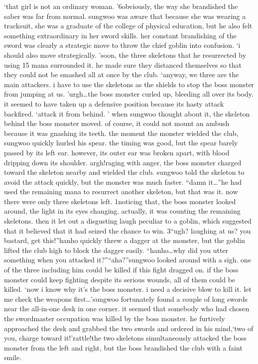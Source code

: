 ‘that girl is not an ordinary woman.
’6obviously, the way she brandished the saber was far from normal.
 sungwoo was aware that because she was wearing a tracksuit, she was a graduate of the college of physical education, but he also felt something extraordinary in her sword skills.
her constant brandishing of the sword was clearly a strategic move to throw the chief goblin into confusion.
‘i should also move strategically.
’soon, the three skeletons that he resurrected by using 15 mana surrounded it.
 he made sure they distanced themselves so that they could not be smashed all at once by the club.
‘anyway, we three are the main attackers.
 i have to use the skeletons as the shields to stop the boss monster from jumping at us.
’urgh…the boss monster curled up, bleeding all over its body.
 it seemed to have taken up a defensive position because its hasty attack backfired.
‘attack it from behind.
’
when sungwoo thought about it, the skeleton behind the boss monster moved.
 of course, it could not mount an ambush because it was gnashing its teeth.
the moment the monster wielded the club, sungwoo quickly hurled his spear.
the timing was good, but the spear barely passed by its left ear.
 however, its outer ear was broken apart, with blood dripping down its shoulder.
argh!raging with anger, the boss monster charged toward the skeleton nearby and wielded the club.
 sungwoo told the skeleton to avoid the attack quickly, but the monster was much faster.
“damn it…”he had used the remaining mana to resurrect another skeleton, but that was it.
 now there were only three skeletons left.
1noticing that, the boss monster looked around, the light in its eyes changing.
 actually, it was counting the remaining skeletons.
then it let out a disgusting laugh peculiar to a goblin, which suggested that it believed that it had seized the chance to win.
3“ugh? laughing at us? you bastard, get this!”hanho quickly threw a dagger at the monster, but the goblin lifted the club high to block the dagger easily.
“hanho…why did you utter something when you attacked it?”“aha?”sungwoo looked around with a sigh.
 one of the three including him could be killed if this fight dragged on.
 if the boss monster could keep fighting despite its serious wounds, all of them could be killed.
‘now i know why it’s the boss monster.
 i need a decisive blow to kill it.
 let me check the weapons first…’sungwoo fortunately found a couple of long swords near the all-in-one desk in one corner.
 it seemed that somebody who had chosen the swordmaster occupation was killed by the boss monster.
he furtively approached the desk and grabbed the two swords and ordered in his mind,‘two of you, charge toward it!’rattle!the two skeletons simultaneously attacked the boss monster from the left and right, but the boss brandished the club with a faint smile.
